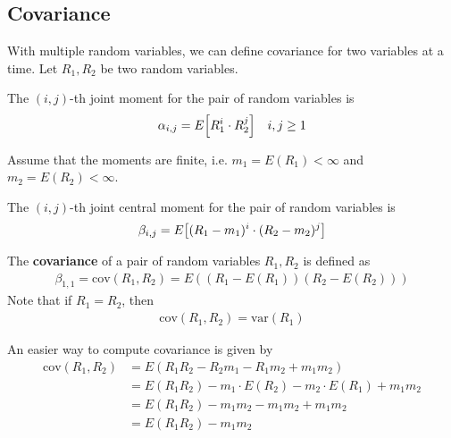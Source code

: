 \subsection{Covariance}
With multiple random variables, we can define covariance for two variables at a time. Let $R_1,R_2$ be two random variables.
\begin{definition}
     The $(i,j)$-th joint moment for the pair of random variables is
    \begin{align}
        \alpha_{i,j} = E\qty[R_1^i \cdot R_2^j] && i,j \ge 1
    \end{align}
\end{definition}
Assume that the moments are finite, i.e. $m_1 = E(R_1) < \infty$ and $m_2 = E(R_2) < \infty$.
\begin{definition}
    The $(i,j)$-th joint central moment for the pair of random variables is
    \begin{align}
        \beta_{i,j} = E\qty[(R_1 - m_1)^i \cdot (R_2 - m_2)^j]
    \end{align}
\end{definition}
\begin{definition}
    The \textbf{covariance} of a pair of random variables $R_1,R_2$ is defined as
    \begin{align}
        \beta_{1,1} = \text{cov}(R_1, R_2) = E((R_1 - E(R_1)) (R_2 - E(R_2)))
    \end{align}
    Note that if $R_1 = R_2$, then
    \begin{align}
        \text{cov}(R_1,R_2) = \text{var}(R_1)
    \end{align}
\end{definition}
\begin{proposition}
    An easier way to compute covariance is given by
    \begin{align}
        \text{cov}(R_1,R_2) &= E(R_1R_2 - R_2m_1 - R_1m_2 + m_1m_2)\\
        &= E(R_1R_2) - m_1 \cdot E(R_2) - m_2 \cdot E(R_1) + m_1m_2\\
        &= E(R_1R_2) - m_1 m_2 - m_1 m_2 + m_1m_2\\
        &= E(R_1R_2) - m_1 m_2
    \end{align}
\end{proposition}


